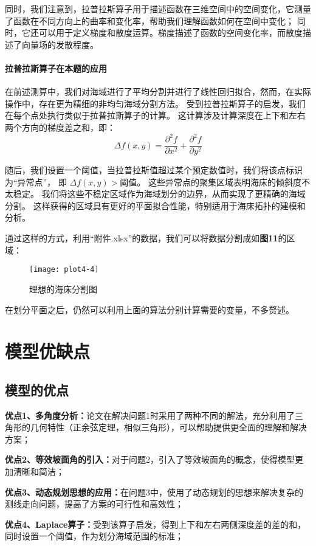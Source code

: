 \documentclass{cumcmthesis}
\begin{document}
同时，我们注意到，拉普拉斯算子用于描述函数在三维空间中的空间变化，它测量了函数在不同方向上的曲率和变化率，帮助我们理解函数如何在空间中变化；
同时，它还可以用于定义梯度和散度运算。梯度描述了函数的空间变化率，而散度描述了向量场的发散程度。

\paragraph*{拉普拉斯算子在本题的应用}
在前述测算中，我们对海域进行了平均分割并进行了线性回归拟合，然而，在实际操作中，存在更为精细的非均匀海域分割方法。
受到拉普拉斯算子的启发，我们在每个点处执行类似于拉普拉斯算子的计算。
这计算涉及计算深度在上下和左右两个方向的梯度差之和，即：
\[\Delta f(x, y) = \frac{\partial^2 f}{\partial x^2} + \frac{\partial^2 f}{\partial y^2}\]

随后，我们设置一个阈值，当拉普拉斯值超过某个预定数值时，我们将该点标识为“异常点”，
即 $\Delta f(x, y) > $阈值。
这些异常点的聚集区域表明海床的倾斜度不太稳定。
我们将这些不稳定区域作为海域划分的边界，从而实现了更精确的海域分割。
这样获得的区域具有更好的平面拟合性能，特别适用于海床拓扑的建模和分析。

通过这样的方式，利用“附件.xlsx”的数据，我们可以将数据分割成如\textbf{图11}的区域：
\begin{figure}[!h]
    \centering
    \texttt{[image: plot4-4]}
    \caption{理想的海床分割图}
    \label{fig:plot4-4}
\end{figure}
\FloatBarrier

在划分平面之后，仍然可以利用上面的算法分别计算需要的变量，不多赘述。

\section{模型优缺点}
\subsection{模型的优点}
\textbf{优点1、多角度分析：}论文在解决问题1时采用了两种不同的解法，充分利用了三角形的几何特性（正余弦定理，相似三角形），可以帮助提供更全面的理解和解决方案；

\textbf{优点2、等效坡面角的引入：}对于问题2，引入了等效坡面角的概念，使得模型更加清晰和简洁；

\textbf{优点3、动态规划思想的应用：}在问题3中，使用了动态规划的思想来解决复杂的测线走向问题，提高了方案的可行性和高效性；

\textbf{优点4、Laplace算子：}受到该算子启发，得到上下和左右两侧深度差的差的和，同时设置一个阈值，作为划分海域范围的标准；
\end{document}
